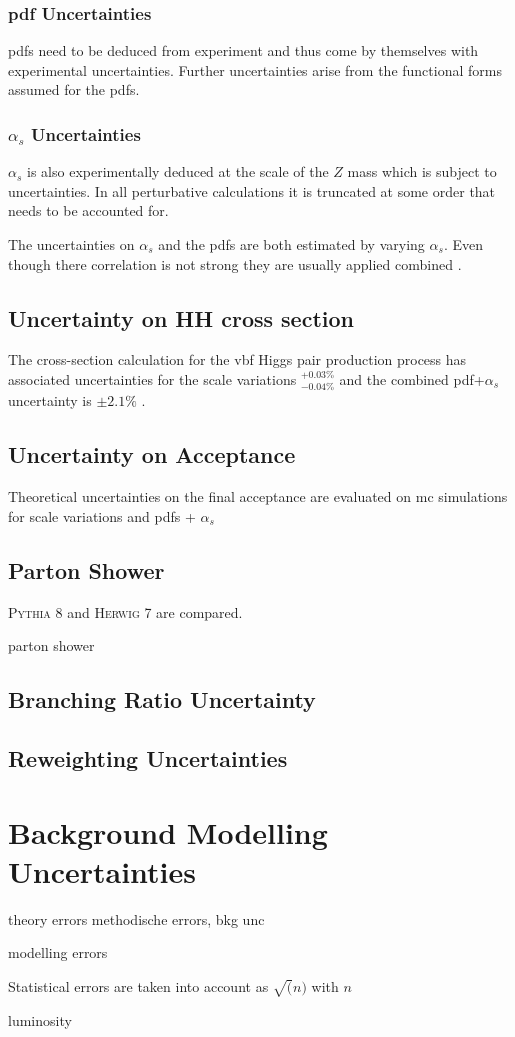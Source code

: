 \subsubsection*{\ac{pdf} Uncertainties}
\acp{pdf} need to be deduced from experiment and thus come by themselves with experimental uncertainties. Further uncertainties arise from the functional forms assumed for the \acp{pdf}.

\subsubsection*{$\alpha_s$ Uncertainties}
$\alpha_s$ is also experimentally deduced at the scale of the $Z$ mass which is subject to uncertainties. In all perturbative calculations it is truncated at some order that needs to be accounted for. 

The uncertainties on $\alpha_s$ and the \acp{pdf} are both estimated by varying $\alpha_s$. Even though there correlation is not strong they are usually applied combined \citep{unc_recipe}.

\subsection{Uncertainty on HH cross section}
The cross-section calculation for the \ac{vbf} Higgs pair production process has associated uncertainties for the scale variations $^{+0.03\%}_{-0.04\%}$ and the combined \ac{pdf}+$\alpha_s$ uncertainty is $\pm 2.1\%$ \citep{de2016arxiv}. 

\subsection{Uncertainty on Acceptance}
Theoretical uncertainties on the final acceptance are evaluated on \ac{mc} simulations for scale variations and \acp{pdf} + $\alpha_s$  

\subsection{Parton Shower}
\textsc{Pythia 8} and \textsc{Herwig 7} are compared. 

parton shower 
\subsection{Branching Ratio Uncertainty}

\subsection{Reweighting Uncertainties}

\section{Background Modelling Uncertainties}






theory errors
methodische errors, bkg unc


modelling errors

Statistical errors are taken into account as $\sqrt(n)$ with $n$

luminosity

